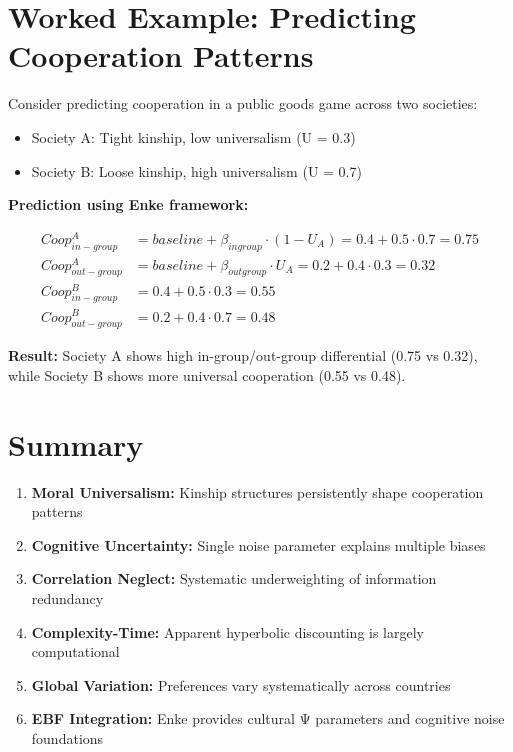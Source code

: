 \section{Worked Example: Predicting Cooperation Patterns}

Consider predicting cooperation in a public goods game across two societies:
\begin{itemize}
    \item Society A: Tight kinship, low universalism (U = 0.3)
    \item Society B: Loose kinship, high universalism (U = 0.7)
\end{itemize}

\textbf{Prediction using Enke framework:}

\begin{align}
Coop_{in-group}^A &= baseline + \beta_{ingroup} \cdot (1-U_A) = 0.4 + 0.5 \cdot 0.7 = 0.75 \\
Coop_{out-group}^A &= baseline + \beta_{outgroup} \cdot U_A = 0.2 + 0.4 \cdot 0.3 = 0.32 \\
Coop_{in-group}^B &= 0.4 + 0.5 \cdot 0.3 = 0.55 \\
Coop_{out-group}^B &= 0.2 + 0.4 \cdot 0.7 = 0.48
\end{align}

\textbf{Result:} Society A shows high in-group/out-group differential (0.75 vs 0.32), while Society B shows more universal cooperation (0.55 vs 0.48).

\section{Summary}

\begin{tcolorbox}[colback=gray!10!white, colframe=gray!75!black, title=Key Takeaways]
\begin{enumerate}
    \item \textbf{Moral Universalism:} Kinship structures persistently shape cooperation patterns
    \item \textbf{Cognitive Uncertainty:} Single noise parameter explains multiple biases
    \item \textbf{Correlation Neglect:} Systematic underweighting of information redundancy
    \item \textbf{Complexity-Time:} Apparent hyperbolic discounting is largely computational
    \item \textbf{Global Variation:} Preferences vary systematically across countries
    \item \textbf{EBF Integration:} Enke provides cultural Ψ parameters and cognitive noise foundations
\end{enumerate}
\end{tcolorbox}

